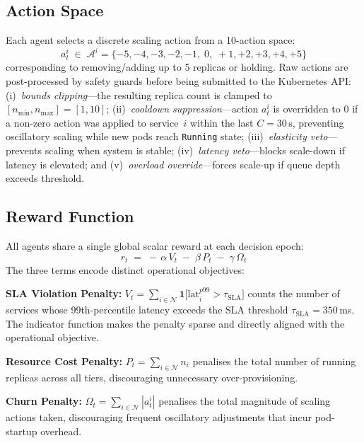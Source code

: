 \documentclass[conference]{IEEEtran}
\begin{document}
\subsection{Action Space}

Each agent selects a discrete scaling action from a 10-action space:
\begin{equation}
  a_t^i \;\in\; \mathcal{A}^i = \{-5, -4, -3, -2, -1,\; 0,\; +1, +2, +3, +4, +5\}
  \label{eq:action}
\end{equation}
corresponding to removing/adding up to 5 replicas or holding. Raw
actions are post-processed by safety guards before being submitted to
the Kubernetes API: (i)~\emph{bounds clipping}---the resulting replica
count is clamped to $[n_{\min}, n_{\max}] = [1, 10]$;
(ii)~\emph{cooldown suppression}---action $a_t^i$ is overridden to $0$
if a non-zero action was applied to service~$i$ within the last
$C = 30$\,s, preventing oscillatory scaling while new pods reach
\texttt{Running} state; (iii)~\emph{elasticity veto}---prevents scaling
when system is stable; (iv)~\emph{latency veto}---blocks scale-down if
latency is elevated; and (v)~\emph{overload override}---forces scale-up
if queue depth exceeds threshold.

\subsection{Reward Function}

All agents share a single global scalar reward at each decision
epoch:
\begin{equation}
  r_t \;=\; -\,\alpha\,V_t \;-\; \beta\,P_t \;-\; \gamma\,\Omega_t
  \label{eq:reward}
\end{equation}
The three terms encode distinct operational objectives:

\textbf{SLA Violation Penalty:}
$V_t = \sum_{i \in \mathcal{N}}
\mathbf{1}\bigl[\mathrm{lat}^{p99}_i > \tau_{\mathrm{SLA}}\bigr]$
counts the number of services whose 99th-percentile latency exceeds
the SLA threshold $\tau_{\mathrm{SLA}} = 350$\,ms. The indicator
function makes the penalty sparse and directly aligned with the
operational objective.

\textbf{Resource Cost Penalty:}
$P_t = \sum_{i \in \mathcal{N}} n_i$
penalises the total number of running replicas across all tiers,
discouraging unnecessary over-provisioning.

\textbf{Churn Penalty:}
$\Omega_t = \sum_{i \in \mathcal{N}} |a_t^i|$
penalises the total magnitude of scaling actions taken, discouraging
frequent oscillatory adjustments that incur pod-startup overhead.
\end{document}
